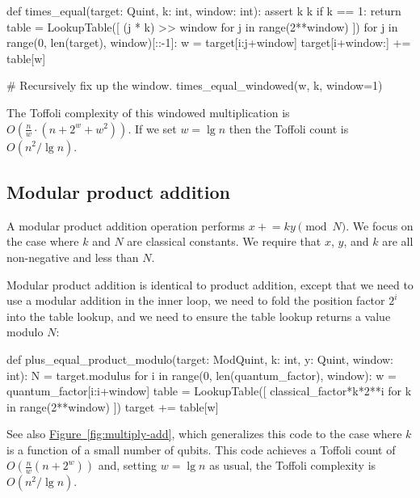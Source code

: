 \documentclass[onecolumn,unpublished]{quantumarticle}
\theoremstyle{definition}
\theoremstyle{definition}
\theoremstyle{definition}
\newcommand{\fig}[1]{\hyperref[fig:#1]{Figure~\ref*{fig:#1}}}
\newcommand{\pluseq}{\mathrel{+}=}
\begin{document}
\begin{python}
    def times_equal(target: Quint, k: int, window: int):
        assert k %
        k %
        if k == 1:
            return
        table = LookupTable([
            (j * k) >> window
            for j in range(2**window)
        ])
        for j in range(0, len(target), window)[::-1]:
            w = target[i:j+window]
            target[i+window:] += table[w]

            # Recursively fix up the window.
            times_equal_windowed(w, k, window=1)
\end{python}

The Toffoli complexity of this windowed multiplication is $O(\frac{n}{w} \cdot (n + 2^w + w^2))$.
If we set $w = \lg n$ then the Toffoli count is $O(n^2/\lg n)$.


\subsection{Modular product addition}

A modular product addition operation performs $x \pluseq k y \pmod{N}$.
We focus on the case where $k$ and $N$ are classical constants.
We require that $x$, $y$, and $k$ are all non-negative and less than $N$.

Modular product addition is identical to product addition, except that we need to use a modular addition in the inner loop, we need to fold the position factor $2^i$ into the table lookup, and we need to ensure the table lookup returns a value modulo $N$:

\begin{python}
    def plus_equal_product_modulo(target: ModQuint,
                                  k: int,
                                  y: Quint,
                                  window: int):
        N = target.modulus
        for i in range(0, len(quantum_factor), window):
            w = quantum_factor[i:i+window]
            table = LookupTable([
                classical_factor*k*2**i %
                for k in range(2**window)
            ])
            target += table[w]
\end{python}

See also \fig{multiply-add}, which generalizes this code to the case where $k$ is a function of a small number of qubits.
This code achieves a Toffoli count of $O(\frac{n}{w} (n + 2^w))$ and, setting $w=\lg n$ as usual, the Toffoli complexity is $O(n^2/\lg n)$.
\end{document}
